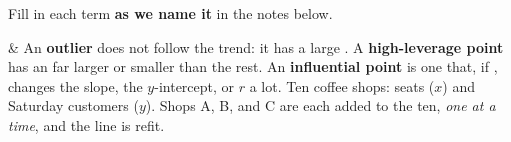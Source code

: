 \documentclass[12pt]{article}
\begin{document}

\vspace{2pt}

\boxguard[16]
\begin{vocabbox}
\small
Fill in each term \textbf{as we name it} in the notes below.
\par
{}
\par
{}
\par
{}
\par
\end{vocabbox}

\small
\begin{guidednotes}
 &
An \textbf{outlier} does not follow the trend: it has a large \blank{1.6cm}. A
\textbf{high-leverage point} has an \blank{1.4cm} far larger or smaller than the rest. An
\textbf{influential point} is one that, if \blank{1.6cm}, changes the slope, the $y$-intercept,
or $r$ a lot. Ten coffee shops: seats ($x$) and Saturday customers ($y$). Shops A, B, and C are each added to
the ten, \emph{one at a time}, and the line is refit.


\end{guidednotes}
\end{document}
